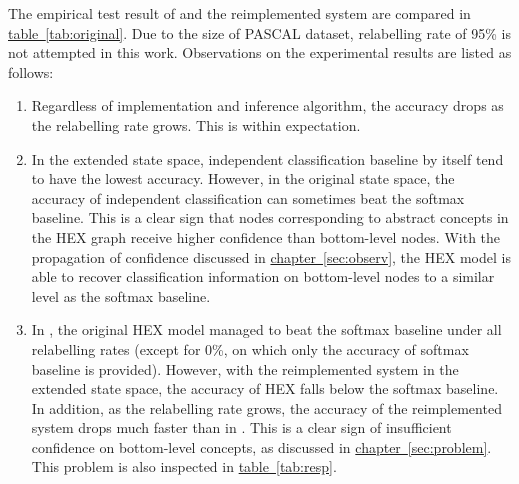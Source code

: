 \documentclass[11pt,a4paper]{book}
\begin{document}
The empirical test result of \cite{deng2014large} and the reimplemented system are compared in \hyperref[tab:original]{table~\ref{tab:original}}. Due to the size of PASCAL dataset, relabelling rate of 95\% is not attempted in this work. Observations on the experimental results are listed as follows:
\begin{enumerate}
\item Regardless of implementation and inference algorithm, the accuracy drops as the relabelling rate grows. This is within expectation.
\item In the extended state space, independent classification baseline by itself tend to have the lowest accuracy. However, in the original state space, the accuracy of independent classification can sometimes beat the softmax baseline. This is a clear sign that nodes corresponding to abstract concepts in the HEX graph receive higher confidence than bottom-level nodes. With the propagation of confidence discussed in \hyperref[sec:observ]{chapter~\ref{sec:observ}}, the HEX model is able to recover classification information on bottom-level nodes to a similar level as the softmax baseline.
\item In \cite{deng2014large}, the original HEX model managed to beat the softmax baseline under all relabelling rates (except for 0\%, on which only the accuracy of softmax baseline is provided). However, with the reimplemented system in the extended state space, the accuracy of HEX falls below the softmax baseline. In addition, as the relabelling rate grows, the accuracy of the reimplemented system drops much faster than in \cite{deng2014large}. This is a clear sign of insufficient confidence on bottom-level concepts, as discussed in \hyperref[sec:problem]{chapter~\ref{sec:problem}}. This problem is also inspected in \hyperref[tab:resp]{table~\ref{tab:resp}}.
\end{enumerate}
\end{document}

